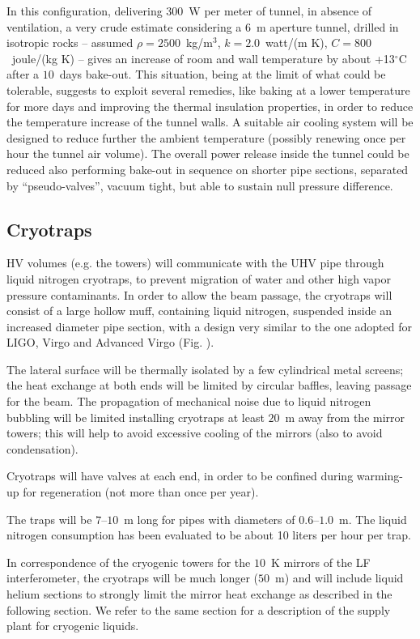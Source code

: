 In this configuration, delivering $300$~W per meter of tunnel, in absence of ventilation, a very crude estimate considering a $6$~m aperture tunnel, drilled in isotropic rocks -- assumed $\rho = 2500$~kg/m$^{3}$, $k = 2.0$~watt/(m K), $C = 800$~joule/(kg K) -- gives an increase of room and wall temperature by about +13$^{\circ}$C after a $10$~days bake-out. This situation, being at the limit of what could be tolerable, suggests to exploit several remedies, like baking at a lower temperature for more days and improving the thermal insulation properties, in order to reduce the temperature increase of the tunnel walls. A suitable air cooling system will be designed to reduce further the ambient temperature (possibly renewing once per hour the tunnel air volume). The overall power release inside the tunnel could be reduced also performing bake-out in sequence on shorter pipe sections, separated by ``pseudo-valves'', vacuum tight, but able to sustain null pressure difference.

\subsection{Cryotraps} 
HV volumes (e.g. the towers) will communicate with the UHV pipe through liquid nitrogen cryotraps, to prevent migration of water and other high vapor pressure contaminants. In order to allow the beam passage, the cryotraps will consist of a large hollow muff, containing liquid nitrogen, suspended inside an increased diameter pipe section, with a design very similar to the one adopted for LIGO, Virgo and Advanced Virgo (Fig. %
). 

The lateral surface will be thermally isolated by a few cylindrical metal screens; the heat exchange at both ends will be limited by circular baffles, leaving passage for the beam. The propagation of mechanical noise due to liquid nitrogen bubbling will be limited installing cryotraps at least $20$~m away from the mirror towers; this will help to avoid excessive cooling of the mirrors (also to avoid condensation). 

Cryotraps will have valves at each end, in order to be confined during warming-up for regeneration (not more than once per year). 

The traps will be $7$--$10$~m long for pipes with diameters of $0.6$--$1.0$~m. The liquid nitrogen consumption has been evaluated to be about 10 liters per hour per trap. 

In correspondence of the cryogenic towers for the $10$~K mirrors of the LF interferometer, the cryotraps will be much longer ($50$~m) and will include liquid helium sections to strongly limit the mirror heat exchange as described in the following section. We refer to the same section for a description of the supply plant for cryogenic liquids. 

